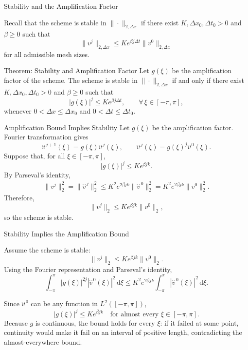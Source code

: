 \documentclass{beamer}
\newcommand{\dd}{\mathrm{d}}
\begin{document}
\begin{frame}{Stability and the Amplification Factor}

Recall that the scheme is stable in $\|\cdot\|_{2,\Delta x}$ if there exist
$K,\Delta x_0,\Delta t_0>0$ and $\beta\ge0$ such that
\[
\|v^j\|_{2,\Delta x}
\le K e^{\beta j\Delta t}\|v^0\|_{2,\Delta x}
\]
for all admissible mesh sizes.

\begin{block}{Theorem: Stability and Amplification Factor}
Let $g(\xi)$ be the amplification factor of the scheme. The scheme is
stable in $\|\cdot\|_{2,\Delta x}$ if and only if there exist
$K,\Delta x_0,\Delta t_0>0$ and $\beta\ge0$ such that
\[
|g(\xi)|^j\le K e^{\beta j\Delta t},
\qquad \forall\,\xi\in[-\pi,\pi],
\]
whenever $0<\Delta x\le\Delta x_0$ and
$0<\Delta t\le\Delta t_0$.
\end{block}
\end{frame}


\begin{frame}{Amplification Bound Implies Stability}
Let $g(\xi)$ be the amplification factor. Fourier transformation gives
\[
\widehat v^{\,j+1}(\xi)
=g(\xi)\widehat v^{\,j}(\xi),
\qquad
\widehat v^{\,j}(\xi)
=g(\xi)^j\widehat v^{\,0}(\xi).
\]
Suppose that, for all $\xi\in[-\pi,\pi]$,
\[
|g(\xi)|^j\le K e^{\beta jk}.
\]
By Parseval's identity,
\[
\begin{aligned}
\|v^j\|_2^2
=\|\widehat v^{\,j}\|_2^2\le K^2 e^{2\beta jk}\|\widehat v^{\,0}\|_2^2=K^2 e^{2\beta jk}\|v^0\|_2^2.
\end{aligned}
\]
Therefore,
\[
\|v^j\|_2\le K e^{\beta jk}\|v^0\|_2,
\]
so the scheme is stable.

\end{frame}


\begin{frame}{Stability Implies the Amplification Bound}

Assume the scheme is stable:
\[
\|v^j\|_2\le K e^{\beta jk}\|v^0\|_2.
\]
Using the Fourier representation and Parseval's identity,
\[
\int_{-\pi}^{\pi}|g(\xi)|^{2j}|\widehat v^{\,0}(\xi)|^2\,\dd\xi
\le
K^2e^{2\beta jk}
\int_{-\pi}^{\pi}|\widehat v^{\,0}(\xi)|^2\,\dd\xi.
\]

Since $\widehat v^{\,0}$ can be any function in $L^2([-\pi,\pi])$,
\[
|g(\xi)|^j\le K e^{\beta jk}
\quad\text{for almost every }\xi\in[-\pi,\pi].
\]
Because $g$ is continuous, the bound holds for every $\xi$:
if it failed at some point, continuity would make it fail on an
interval of positive length, contradicting the almost-everywhere bound.
\end{frame}
\end{document}
